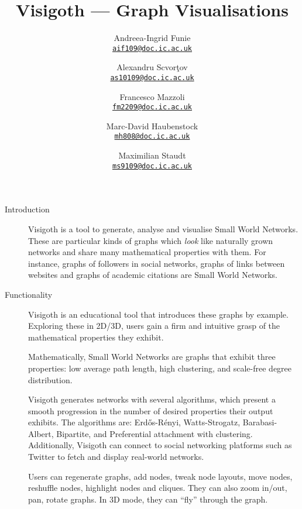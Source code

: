 \documentclass[a4paper,11pt]{article}
\let\stdhref\href
\renewcommand{\href}[2]{\stdhref{#1}{\texttt{#2}}}
\newcommand{\mailto}[1]{\href{mailto:#1}{#1}}
\begin{document}
\title{Visigoth --- Graph Visualisations}
\author{
  Andreea-Ingrid Funie\\\mailto{aif109@doc.ic.ac.uk}\and
  Alexandru Scvor\c tov\\\mailto{as10109@doc.ic.ac.uk}\and
  Francesco Mazzoli\\\mailto{fm2209@doc.ic.ac.uk}\and
  Marc-David Haubenstock\\\mailto{mh808@doc.ic.ac.uk}\and
  Maximilian Staudt\\\mailto{ms9109@doc.ic.ac.uk}
}
\date{}
\maketitle

\begin{description}
\item[Introduction]

  Visigoth is a tool to generate, analyse and visualise Small World
  Networks. These are particular kinds of graphs which \emph{look}
  like naturally grown networks and share many mathematical properties
  with them.  For instance, graphs of followers in social networks,
  graphs of links between websites and graphs of academic citations
  are Small World Networks.

  \item[Functionality]

  Visigoth is an educational tool that introduces these graphs by
  example.  Exploring these in 2D/3D, users gain a firm and intuitive
  grasp of the mathematical properties they exhibit.

  Mathematically, Small World Networks are graphs that exhibit three
  properties: low average path length, high clustering, and scale-free
  degree distribution.

  Visigoth generates networks with several algorithms, which present a
  smooth progression in the number of desired properties their output
  exhibits. The algorithms are: Erd\H{o}s-R\'{e}nyi, Watts-Strogatz,
  Barabasi-Albert, Bipartite, and Preferential attachment with
  clustering. Additionally, Visigoth can connect to social networking
  platforms such as Twitter to fetch and display real-world networks.

  Users can regenerate graphs, add nodes, tweak node layouts, move
  nodes, reshuffle nodes, highlight nodes and cliques. They can also
  zoom in/out, pan, rotate graphs. In 3D mode, they can ``fly''
  through the graph.


\end{description}
\end{document}
